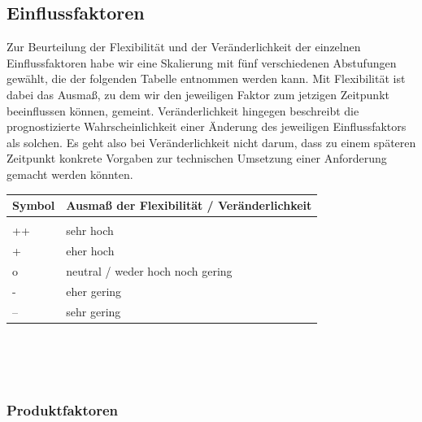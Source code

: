 \documentclass[enabledeprecatedfontcommands,fontsize=11pt,paper=a4,twoside]{scrartcl}
\newcounter{one}
\begin{document}
\subsection{Einflussfaktoren}
\label{sec:einflussfaktoren}

Zur Beurteilung der Flexibilität und der Veränderlichkeit der einzelnen Einflussfaktoren habe wir eine Skalierung mit fünf verschiedenen Abstufungen gewählt, die der folgenden Tabelle entnommen werden kann. Mit Flexibilität ist dabei das Ausmaß, zu dem wir den jeweiligen Faktor zum jetzigen Zeitpunkt beeinflussen können, gemeint. Veränderlichkeit hingegen beschreibt die prognostizierte Wahrscheinlichkeit einer Änderung des jeweiligen Einflussfaktors als solchen. Es geht also bei Veränderlichkeit nicht darum, dass zu einem späteren Zeitpunkt konkrete Vorgaben zur technischen Umsetzung einer Anforderung gemacht werden könnten. \\

\begin{tabular}{p{2cm}p{8cm}}
	Symbol & Ausmaß der Flexibilität / Veränderlichkeit \\ \hline \\
	++ & sehr hoch \\ 
	+ & eher hoch \\ 
	o & neutral / weder hoch noch gering \\ 
	- & eher gering \\ 
	-- & sehr gering \\ 
\end{tabular}\\ \\ \\




\newpage
\def\arraystretch{1.5}
\subsubsection{Produktfaktoren}
\setcounter{one}{1}
\end{document}
